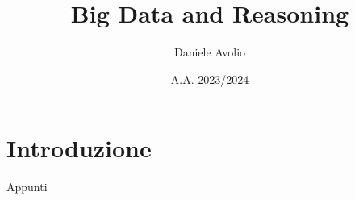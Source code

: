 \documentclass{article}
\title{Big Data and Reasoning}
\author{Daniele Avolio}
\date{A.A. 2023/2024}
\begin{document}
\maketitle
\newpage

\tableofcontents
\newpage

\section{Introduzione}
Appunti 


\end{document}
